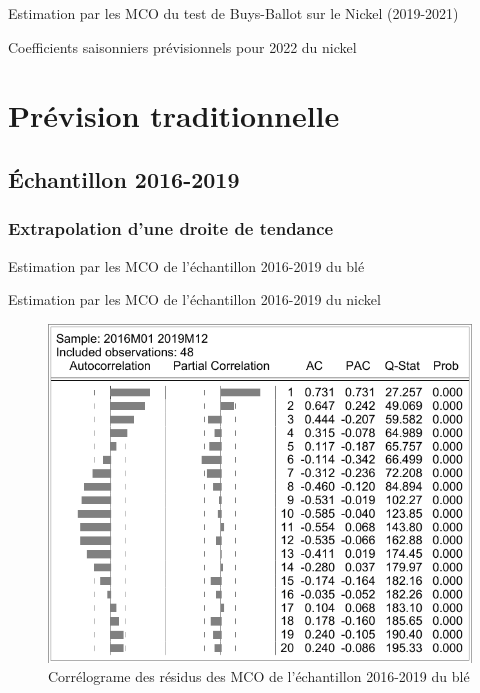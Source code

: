 \documentclass[12pt,a4paper]{article}
\begin{document}
\begin{table}[H]
    \centering
    \caption{Estimation par les MCO du test de Buys-Ballot sur le Nickel (2019-2021)}
    \label{tab:bb_test}
    \sffamily
    
\end{table}

\begin{table}[H]
    \centering
    \caption{Coefficients saisonniers prévisionnels pour 2022 du nickel}
    \label{tab:coef_saiso}
    \sffamily
    
\end{table}

\section{Prévision traditionnelle}
\setcounter{table}{0}
\setcounter{figure}{0}
\subsection{Échantillon 2016-2019}
\subsubsection{Extrapolation d'une droite de tendance}\label{appendix:extra_19}
\begin{table}[H]
    \centering
    \caption{Estimation par les MCO de l'échantillon 2016-2019 du blé}
    \label{tab:mco_ble19}
    \sffamily
    
\end{table}

\begin{table}[H]
    \centering
    \caption{Estimation par les MCO de l'échantillon 2016-2019 du nickel}
    \label{tab:mco_nickel19}
    \sffamily
    
\end{table}

\begin{figure}[H]
    \centering
    \includegraphics[]{annexe/3_1_extra_cor_ble19.pdf}
    \caption{Corrélograme des résidus des MCO de l'échantillon 2016-2019 du blé}
    \label{fig:extra_cor_ble19}
\end{figure}
\end{document}

